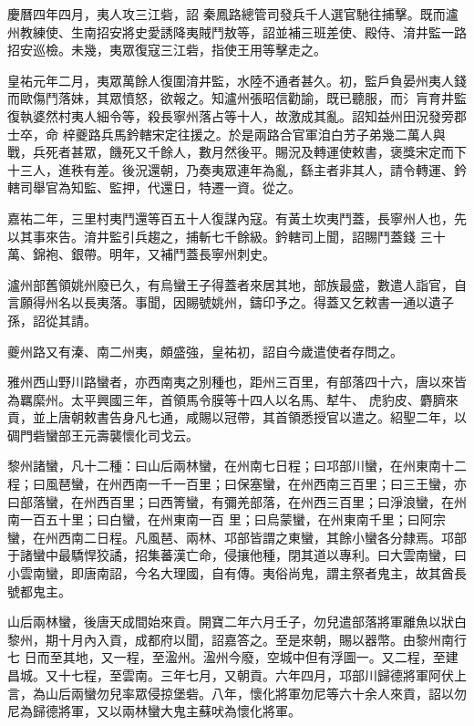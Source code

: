 \begin{pinyinscope}
 慶曆四年四月，夷人攻三江砦，詔
 秦鳳路總管司發兵千人選官馳往捕擊。既而瀘州教練使、生南招安將史愛誘降夷賊鬥敖等，詔並補三班差使、殿侍、淯井監一路招安巡檢。未幾，夷眾復寇三江砦，指使王用等擊走之。



 皇祐元年二月，夷眾萬餘人復圍淯井監，水陸不通者甚久。初，監戶負晏州夷人錢而歐傷鬥落妹，其眾憤怒，欲報之。知瀘州張昭信勸諭，既已聽服，而氵肓育井監復執婆然村夷人細令等，殺長寧州落占等十人，故激成其亂。詔知益州田況發旁郡士卒，命
 梓夔路兵馬鈐轄宋定往援之。於是兩路合官軍洎白艻子弟幾二萬人與戰，兵死者甚眾，饑死又千餘人，數月然後平。賜況及轉運使敕書，褒獎宋定而下十三人，進秩有差。後況還朝，乃奏夷眾連年為亂，繇主者非其人，請令轉運、鈐轄司舉官為知監、監押，代還日，特遷一資。從之。



 嘉祐二年，三里村夷鬥還等百五十人復謀內寇。有黃土坎夷鬥蓋，長寧州人也，先以其事來告。淯井監引兵趨之，捕斬七千餘級。鈐轄司上聞，詔賜鬥蓋錢
 三十萬、錦袍、銀帶。明年，又補鬥蓋長寧州刺史。



 瀘州部舊領姚州廢已久，有烏蠻王子得蓋者來居其地，部族最盛，數遣人詣官，自言願得州名以長夷落。事聞，因賜號姚州，鑄印予之。得蓋又乞敕書一通以遺子孫，詔從其請。



 夔州路又有溱、南二州夷，頗盛強，皇祐初，詔自今歲遣使者存問之。



 雅州西山野川路蠻者，亦西南夷之別種也，距州三百里，有部落四十六，唐以來皆為羈縻州。太平興國三年，首領馬令膜等十四人以名馬、犎牛、
 虎豹皮、麝臍來貢，並上唐朝敕書告身凡七通，咸賜以冠帶，其首領悉授官以遣之。紹聖二年，以碉門砦蠻部王元壽襲懷化司戈云。



 黎州諸蠻，凡十二種：曰山后兩林蠻，在州南七日程；曰邛部川蠻，在州東南十二程；曰風琶蠻，在州西南一千一百里；曰保塞蠻，在州西南三百里；曰三王蠻，亦曰部落蠻，在州西百里；曰西箐蠻，有彌羌部落，在州西三百里；曰淨浪蠻，在州南一百五十里；曰白蠻，在州東南一百
 里；曰烏蒙蠻，在州東南千里；曰阿宗蠻，在州西南二日程。凡風琶、兩林、邛部皆謂之東蠻，其餘小蠻各分隸焉。邛部于諸蠻中最驕悍狡譎，招集蕃漢亡命，侵攘他種，閉其道以專利。曰大雲南蠻，曰小雲南蠻，即唐南詔，今名大理國，自有傳。夷俗尚鬼，謂主祭者鬼主，故其酋長號都鬼主。



 山后兩林蠻，後唐天成間始來貢。開寶二年六月壬子，勿兒遣部落將軍離魚以狀白黎州，期十月內入貢，成都府以聞，詔嘉答之。至是來朝，賜以器幣。由黎州南行七
 日而至其地，又一程，至溋州。溋州今廢，空城中但有浮圖一。又二程，至建昌城。又十七程，至雲南。三年七月，又朝貢。六年四月，邛部川歸德將軍阿伏上言，為山后兩蠻勿兒率眾侵掠堡砦。八年，懷化將軍勿尼等六十余人來貢，詔以勿尼為歸德將軍，又以兩林蠻大鬼主蘇吠為懷化將軍。




\end{pinyinscope}
